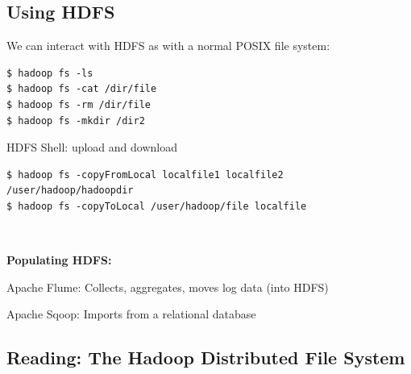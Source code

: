 \documentclass[11pt,oneside,a4paper]{article}
\begin{document}
\subsection{Using HDFS}

We can interact with HDFS as with a normal POSIX file system:

\vspace{-\topsep}
\begin{verbatim}
$ hadoop fs -ls
$ hadoop fs -cat /dir/file
$ hadoop fs -rm /dir/file
$ hadoop fs -mkdir /dir2
\end{verbatim}

HDFS Shell: upload and download

\vspace{-\topsep}
\begin{verbatim}
$ hadoop fs -copyFromLocal localfile1 localfile2 /user/hadoop/hadoopdir
$ hadoop fs -copyToLocal /user/hadoop/file localfile
\end{verbatim}\\
\vspace{-\topsep}

\textbf{Populating HDFS:}
\begin{compactitem}
	\item Apache Flume: Collects, aggregates, moves log data (into HDFS)
	\item Apache Sqoop: Imports from a relational database\\
\end{compactitem}

\subsection{Reading: The Hadoop Distributed File System \cite{shvachko2010hadoop}}
\end{document}
